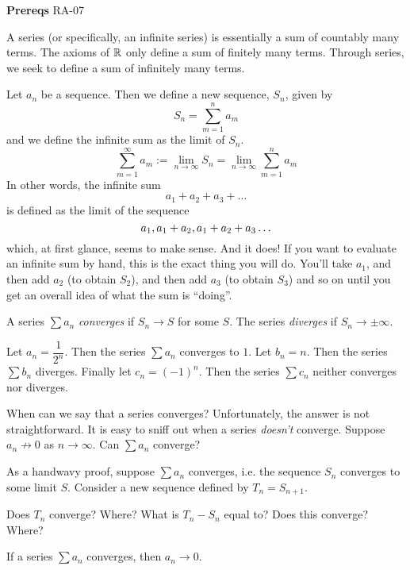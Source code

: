 

\textbf{Prereqs} RA-07

A series (or specifically, an infinite series) is essentially a sum of countably many terms. The axioms of $\mathbb{R}$ only define a sum of finitely many terms. Through series, we seek to define a sum of infinitely many terms.

Let $a_n$ be a sequence. Then we define a new sequence, $S_n$, given by
$$
S_n = \sum\limits_{m = 1}^{n}a_m
$$
and we define the infinite sum as the limit of $S_n$.
$$
\sum\limits_{m = 1}^{\infty}a_m := \lim_{n\to \infty}S_n = \lim_{n\to \infty}\sum\limits_{m = 1}^{n}a_m
$$
In other words, the infinite sum
$$
a_1 + a_2 + a_3 + \ldots
$$
is defined as the limit of the sequence
$$
a_1, \space a_1 + a_2, \space a_1 + a_2 + a_3 \ldots
$$
which, at first glance, seems to make sense. And it does! If you want to evaluate an infinite sum by hand, this is the exact thing you will do. You'll take $a_1$, and then add $a_2$ (to obtain $S_2$), and then add $a_3$ (to obtain $S_3$) and so on until you get an overall idea of what the sum is ``doing''.

\begin{SNP}{\dfn}A series $\sum a_n$ \emph{converges} if $S_n \to S$ for some $S$. The series \emph{diverges} if $S_n \to \pm \infty$.
\end{SNP}
\begin{SNP}{\xmp}Let $a_n = \dfrac{1}{2^n}$. Then the series $\sum a_n$ converges to $1$. Let $b_n = n$. Then the series $\sum b_n$ diverges. Finally let $c_n = (-1)^n$. Then the series $\sum c_n$ neither converges nor diverges.
\end{SNP}
When can we say that a series converges? Unfortunately, the answer is not straightforward. It is easy to sniff out when a series \emph{doesn't} converge. Suppose $a_n \not \to 0$ as $n \to \infty$. Can $\sum a_n$ converge?

As a handwavy proof, suppose $\sum a_n$ converges, i.e. the sequence $S_n$ converges to some limit $S$. Consider a new sequence defined by $T_n = S_{n + 1}$.

\begin{SNP}{\ex}{Does $T_n$ converge? Where? What is $T_n - S_n$ equal to? Does this converge? Where?}
\end{SNP}
\begin{SNP}{\thm}{If a series $\sum a_n$ converges, then $a_n \to 0$.}
\end{SNP}

